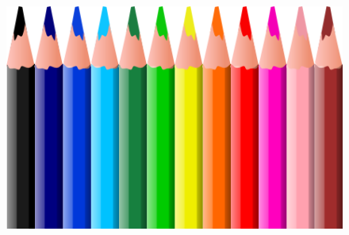 \documentclass[a4paper,11pt]{report}
\begin{document}
\begin{figure}[ht]
\centering
\label{apotelesmata_sel14}
\includegraphics[scale=.4]{pencil.png}
\end{figure}
\end{document}
